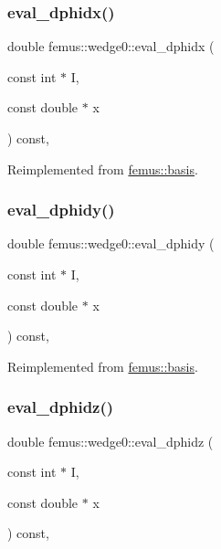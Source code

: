 \subsubsection{\texorpdfstring{eval\+\_\+dphidx()}{eval\_dphidx()}}
{\footnotesize\ttfamily double femus\+::wedge0\+::eval\+\_\+dphidx (\begin{DoxyParamCaption}\item[{const int $\ast$}]{I,  }\item[{const double $\ast$}]{x }\end{DoxyParamCaption}) const\hspace{0.3cm}{\ttfamily [inline]}, {\ttfamily [virtual]}}



Reimplemented from \mbox{\hyperlink{classfemus_1_1basis_a4db7d29cf8a753ddbccc4a297dafa0bf}{femus\+::basis}}.

\mbox{\label{classfemus_1_1wedge0_a9af38b6f15d958fb88a422be0955142d}} 
\subsubsection{\texorpdfstring{eval\+\_\+dphidy()}{eval\_dphidy()}}
{\footnotesize\ttfamily double femus\+::wedge0\+::eval\+\_\+dphidy (\begin{DoxyParamCaption}\item[{const int $\ast$}]{I,  }\item[{const double $\ast$}]{x }\end{DoxyParamCaption}) const\hspace{0.3cm}{\ttfamily [inline]}, {\ttfamily [virtual]}}



Reimplemented from \mbox{\hyperlink{classfemus_1_1basis_a2819fac9aae797156b9efec8a0b85cc1}{femus\+::basis}}.

\mbox{\label{classfemus_1_1wedge0_ae0c76353c2f04e9fad1083a80a643b57}} 
\subsubsection{\texorpdfstring{eval\+\_\+dphidz()}{eval\_dphidz()}}
{\footnotesize\ttfamily double femus\+::wedge0\+::eval\+\_\+dphidz (\begin{DoxyParamCaption}\item[{const int $\ast$}]{I,  }\item[{const double $\ast$}]{x }\end{DoxyParamCaption}) const\hspace{0.3cm}{\ttfamily [inline]}, {\ttfamily [virtual]}}



